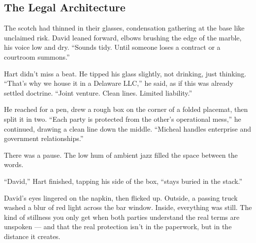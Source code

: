 \medskip

\subsection{The Legal Architecture}

The scotch had thinned in their glasses, condensation gathering at the base like unclaimed risk. David leaned forward, 
elbows brushing the edge of the marble, his voice low and dry. ``Sounds tidy. Until someone loses a contract or a 
courtroom summons.''

Hart didn’t miss a beat. He tipped his glass slightly, not drinking, just thinking. “That’s why we house it in a 
Delaware LLC,” he said, as if this was already settled doctrine. “Joint venture. Clean lines. Limited liability.”

He reached for a pen, drew a rough box on the corner of a folded placemat, then split it in two. “Each party is 
protected from the other’s operational mess,” he continued, drawing a clean line down the middle. “Micheal 
handles enterprise and government relationships.”

There was a pause. The low hum of ambient jazz filled the space between the words.

“David,” Hart finished, tapping his side of the box, “stays buried in the stack.”

David’s eyes lingered on the napkin, then flicked up. Outside, a passing truck washed a blur of red light across 
the bar window. Inside, everything was still. The kind of stillness you only get when both parties understand 
the real terms are unspoken — and that the real protection isn’t in the paperwork, but in the distance it creates.

\medskip

